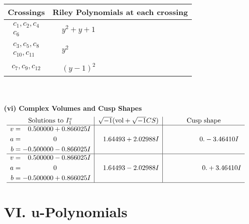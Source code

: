 \documentclass[1p]{elsarticle_modified}
\theoremstyle{definition}
\newcommand{\I}{\sqrt{-1}}
\begin{document}
\begin{tabular}{m{50pt}|m{274pt}}
Crossings & \hspace{64pt}Riley Polynomials at each crossing \\
\hline $$\begin{aligned}c_{1},c_{2},c_{4}\\c_{6}\end{aligned}$$&$\begin{aligned}
&y^2+y+1
\end{aligned}$\\
\hline $$\begin{aligned}c_{3},c_{5},c_{8}\\c_{10},c_{11}\end{aligned}$$&$\begin{aligned}
&y^2
\end{aligned}$\\
\hline $$\begin{aligned}c_{7},c_{9},c_{12}\end{aligned}$$&$\begin{aligned}
&(y-1)^2
\end{aligned}$\\
\hline
\end{tabular}\\~\\
\newpage\flushleft \textbf{(vi) Complex Volumes and Cusp Shapes}
$$\begin{array}{c|c|c}  
\text{Solutions to }I^v_{1}& \I (\text{vol} + \sqrt{-1}CS) & \text{Cusp shape}\\
 \hline 
\begin{aligned}
v &= \phantom{-}0.500000 + 0.866025 I \\
a &= \phantom{-0.000000 } 0 \\
b &= -0.500000 - 0.866025 I\end{aligned}
 & \phantom{-}1.64493 + 2.02988 I & \phantom{-0.000000 } 0. - 3.46410 I \\ \hline\begin{aligned}
v &= \phantom{-}0.500000 - 0.866025 I \\
a &= \phantom{-0.000000 } 0 \\
b &= -0.500000 + 0.866025 I\end{aligned}
 & \phantom{-}1.64493 - 2.02988 I & \phantom{-0.000000 -}0. + 3.46410 I\\
 \hline 
 \end{array}$$\newpage
\newpage\renewcommand{\arraystretch}{1}
\centering \section*{ VI. u-Polynomials}
\end{document}
